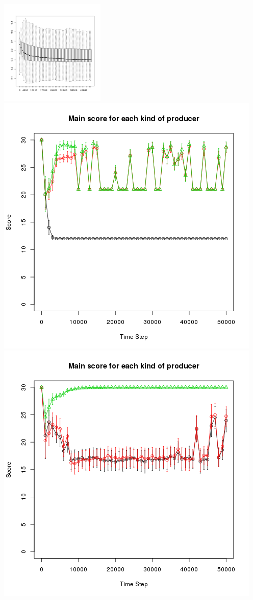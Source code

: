 \documentclass[final]{beamer}
\begin{document}
\begin{frame}
	\begin{columns}
		\includegraphics[height=5cm]{./NonEquilibrium.png}
		\includegraphics[width=\textwidth]{./scoreEx1b.png}\\
		\includegraphics[width=\textwidth]{./scoreEx2b.png}
	\end{columns}
	


\end{frame}
\end{document}
